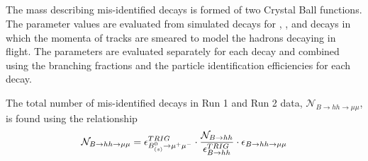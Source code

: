 \subsection{\bhh}%
The mass \pdf describing mis-identified \bhh decays is formed of two Crystal Ball functions. The parameter values are evaluated from simulated decays for \bdkpi, \bskk, \bdpipi and \bskpi decays in which the momenta of tracks are smeared to model the hadrons decaying in flight. The parameters are evaluated separately for each decay and combined using the branching fractions and the particle identification efficiencies for each decay.

The total number of mis-identified \bhh decays in Run 1 and Run 2 data, $\mathcal{N}_{B \to hh \to \mu \mu}$, is found using the relationship
\begin{equation}
\mathcal{N}_{B \to hh \to \mu \mu} = \epsilon^{TRIG}_{B^{0}_{(s)} \to \mu^{+} \mu^{-}} \cdot \frac{\mathcal{N}_{B \to hh}}{\epsilon^{TRIG}_{B \to hh}} \cdot \epsilon_{B \to hh \to \mu\mu}  \\
\label{eq:bhhprediction}
\end{equation}
